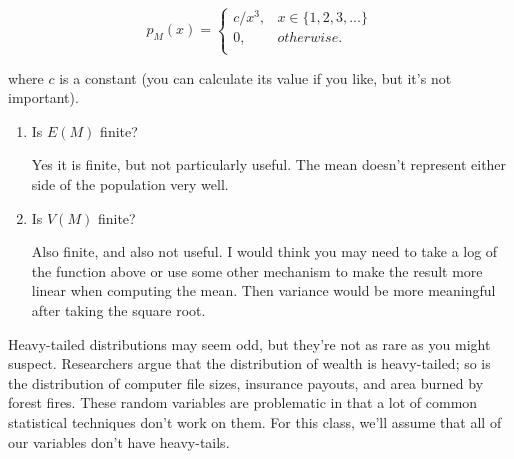 \documentclass[12pt,a4paper]{article}
\numberwithin{equation}{subsection}
\begin{document}
\begin{enumerate}
$$p_M(x) = \begin{cases}
c/x^3, &x \in \{1,2,3,...\}\\
0, &otherwise.\\
\end{cases}
$$

where $c$ is a constant (you can calculate its value if you like, but it's not important).

\begin{enumerate}
\item Is $E(M)$ finite?

Yes it is finite, but not particularly useful. The mean doesn't represent either side of the population very well.

\item Is $V(M)$ finite?

Also finite, and also not useful. I would think you may need to take a log of the function above or use some other mechanism to make the result more linear when computing the mean. Then variance would be more meaningful after taking the square root.

\end{enumerate}

Heavy-tailed distributions may seem odd, but they're not as rare as you might suspect.  Researchers argue that the distribution of wealth is heavy-tailed; so is the distribution of computer file sizes, insurance payouts, and area burned by forest fires.  These random variables are problematic in that a lot of common statistical techniques don't work on them.  For this class, we'll assume that all of our variables don't have heavy-tails.

\end{enumerate}
\end{document}
